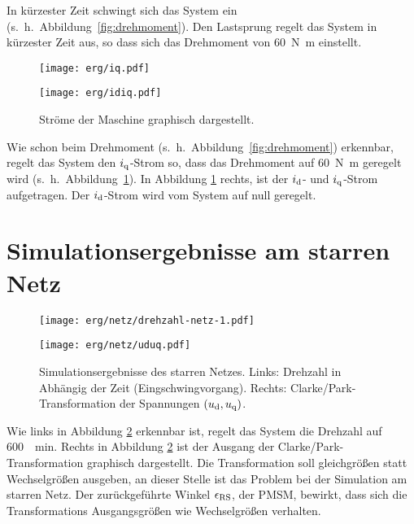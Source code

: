In kürzester Zeit schwingt sich das System ein (s.~h.~Abbildung~\ref{fig:drehmoment}).
Den Lastsprung regelt das System in kürzester Zeit aus, so dass sich das Drehmoment von \SI{60}{\newton\meter} einstellt.

\begin{figure}[h!]
	\begin{minipage}[t]{0.5\textwidth}
		\texttt{[image: erg/iq.pdf]}
	\end{minipage}
	\begin{minipage}[t]{0.5\textwidth} 
		\texttt{[image: erg/idiq.pdf]}
	\end{minipage}
		\caption{Ströme der Maschine graphisch dargestellt.}
		\label{fig:idiq-strom}
	\end{figure}

Wie schon beim Drehmoment (s.~h.~Abbildung~\ref{fig:drehmoment}) erkennbar, regelt das System den $i_{\mathrm{q}}$-Strom so, dass das Drehmoment auf \SI{60}{\newton\meter} geregelt wird (s.~h.~Abbildung~\ref{fig:idiq-strom}).
In Abbildung \ref{fig:idiq-strom} rechts, ist der $i_{\mathrm{d}}$- und $i_{\mathrm{q}}$-Strom aufgetragen.
Der $i_{\mathrm{d}}$-Strom wird vom System auf null geregelt.

\newpage

\section{Simulationsergebnisse am starren Netz}\label{sec:sim-starr-netz}

\begin{figure}[h!]
	\begin{minipage}[t]{0.5\textwidth}
		\texttt{[image: erg/netz/drehzahl-netz-1.pdf]}
	\end{minipage}
	\begin{minipage}[t]{0.5\textwidth} 
		\texttt{[image: erg/netz/uduq.pdf]}
	\end{minipage}
	\caption{Simulationsergebnisse des starren Netzes. Links: Drehzahl in Abhängig der Zeit (Eingschwingvorgang). Rechts: Clarke/Park-Transformation der Spannungen $(u_{\mathrm{d}}, u_{\mathrm{q}})$.}
	\label{fig:n-netz}
\end{figure}

Wie links in Abbildung \ref{fig:n-netz} erkennbar ist, regelt das System die Drehzahl auf \SI{600}{\per\minute}.
Rechts in Abbildung \ref{fig:n-netz} ist der Ausgang der Clarke/Park-Transformation graphisch dargestellt.
Die Transformation soll gleichgrößen statt Wechselgrößen ausgeben, an dieser Stelle ist das Problem bei der Simulation am starren Netz.
Der zurückgeführte Winkel $\epsilon_{\mathrm{RS}}$, der PMSM, bewirkt, dass sich die Transformations Ausgangsgrößen wie Wechselgrößen verhalten.


